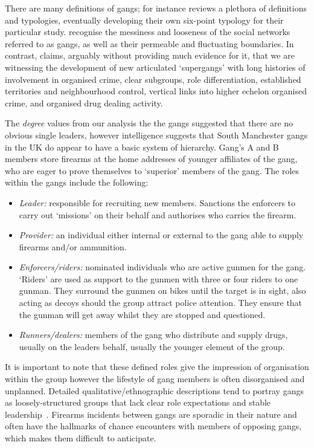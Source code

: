 \documentclass[twocolumn]{svjour3}          %
\theoremstyle{definition}
\begin{document}
There are many definitions of gangs; for instance \citet{pitts:2007}
reviews a plethora of definitions and typologies, eventually
developing their own six-point typology for their particular
study. \citet{aldridge-et-al:2008} recognise the messiness and
looseness of the social networks referred to as gangs, as well as
their permeable and fluctuating boundaries.  In contrast,
\citet{pitts:2008} claims, arguably without providing much evidence
for it, that we are witnessing the development of new articulated
`supergangs' with long histories of involvement in organised crime,
clear subgroups, role differentiation, established territories and
neighbourhood control, vertical links into higher echelon organised
crime, and organised drug dealing activity.

The \emph{degree} values from our analysis the the gangs suggested
that there are no obvious single leaders, however intelligence
suggests that South Manchester gangs in the UK do appear to have a
basic system of hierarchy. Gang's A and B members store firearms at
the home addresses of younger affiliates of the gang, who are eager to
prove themselves to `superior' members of the gang. The roles within
the gangs include the following:

\begin{itemize}
\item \emph{Leader:} responsible for recruiting new members.
Sanctions the enforcers to carry out `missions' on their behalf and
authorises who carries the firearm.
\item \emph{Provider:} an individual either internal or external to
the gang able to supply firearms and/or ammunition.
\item \emph{Enforcers/riders:} nominated individuals who are active
gunmen for the gang. `Riders' are used as support to the gunmen with
three or four riders to one gunman.  They surround the gunmen on bikes
until the target is in sight, also acting as decoys should the group
attract police attention. They ensure that the gunman will get away
whilst they are stopped and questioned.
\item \emph{Runners/dealers:} members of the gang who distribute and
supply drugs, usually on the leaders behalf, usually the younger
element of the group.
\end{itemize}
  
It is important to note that these defined roles give the impression
of organisation within the group however the lifestyle of gang members
is often disorganised and unplanned. Detailed qualitative/ethnographic
descriptions tend to portray gangs as loosely-structured groups that
lack clear role expectations and stable
leadership~\citep{hughes:2005}. Firearms incidents between gangs are
sporadic in their nature and often have the hallmarks of chance
encounters with members of opposing gangs, which makes them difficult
to anticipate.
\end{document}
